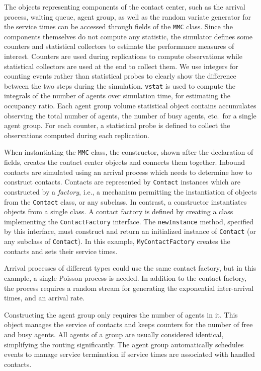 The objects representing components of the contact center, such as
the arrival process, waiting queue, agent group, as well as
the random variate generator for the service times can be accessed
through fields of the \texttt{MMC} class.
Since the components themselves do not compute any statistic, the
simulator defines some counters and statistical collectors to estimate
the performance measures of interest.
Counters are used during replications to compute observations while
statistical collectors are used at the end to collect them.
We use integers for counting events
rather than statistical probes to clearly show the difference between
the two steps during the simulation.
\texttt{vstat} is used to compute the integrals of the number of
agents over simulation time, for estimating the occupancy ratio.
Each agent group volume statistical object contains accumulates
observing the
total number of agents, the number of busy agents, etc.\ for a single
agent group.
For each counter, a statistical probe is defined to collect the
observations computed during each replication.

When instantiating the \texttt{MMC} class, the constructor, shown
after the declaration of fields, creates
the contact center objects and connects them together.
Inbound contacts are simulated using an arrival process which needs
to determine how to construct contacts.
Contacts are represented by \texttt{Contact} instances which are
constructed by a \emph{factory}, i.e.,
a mechanism permitting the instantiation of objects from the
\texttt{Contact} class, or any subclass.
In contrast, a constructor instantiates objects from a
single class.  A contact factory is defined by creating a class
implementing the \texttt{Contact\-Factory} interface.  The
\texttt{new\-Instance}
method, specified by this interface, must construct and return an
initialized instance of \texttt{Contact} (or any subclass of
\texttt{Contact}).  In this example, \texttt{My\-Contact\-Factory}
creates the contacts and sets their service times.

Arrival processes of different types could use the same contact
factory, but in this example, a single Poisson process is needed.
In addition to the contact factory, the process requires a
random stream for generating the exponential inter-arrival times, and
an arrival rate.

Constructing the agent group only requires the number of agents in
it.
This object manages the service of contacts and keeps counters for the
number of free and busy agents.  All agents of a group are usually
considered identical, simplifying the routing significantly.
The agent group automatically schedules events to manage service
termination if service times are associated with handled contacts.

